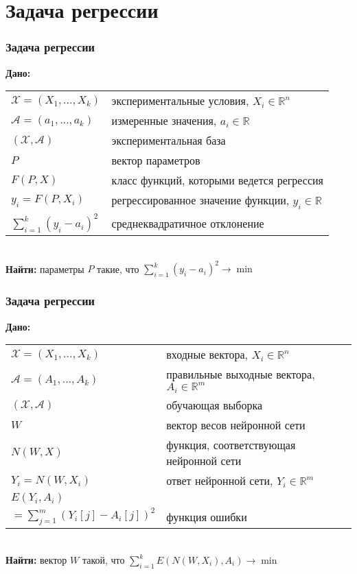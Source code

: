 \documentclass[24pt,pdf,hyperref={unicode}]{beamer}
\begin{document}
\section{Задача регрессии}

\begin{frame}\frametitle{Задача регрессии}
{\bf Дано:}
\begin{tabular}{p{4cm} p{6cm}}
 $\mathcal{X}=(X_1,\ldots,X_k)$ & экспериментальные условия, $X_i\in\mathbb{R}^n$\\[0.1cm]
 $\mathcal{A}=(a_1,\ldots,a_k)$ & измеренные значения, $a_i\in\mathbb{R}$\\[0.1cm]
 $(\mathcal{X},\mathcal{A})$ & экспериментальная база \\[0.1cm]
 $P$ & вектор параметров \\[0.1cm]
 $F(P,X)$ & класс функций, которыми ведется регрессия \\[0.1cm]
 $y_i=F(P,X_i)$ & регрессированное значение функции, $y_i\in\mathbb{R}$ \\[0.1cm]
$\sum_{i=1}^{k} (y_i-a_i)^2 $ & среднеквадратичное отклонение\\
 \end{tabular}\\[1cm]
 {\bf Найти:}
 параметры $P$ такие, что $\sum_{i=1}^{k} (y_i-a_i)^2 \rightarrow \min$
\end{frame}

\begin{frame}\frametitle{Задача регрессии}
{\bf Дано:}
\begin{tabular}{p{4cm} p{6cm}}
 $\mathcal{X}=(X_1,\ldots,X_k)$ & входные вектора, $X_i\in\mathbb{R}^n$\\[0.1cm]
 $\mathcal{A}=(A_1,\ldots,A_k)$ & правильные выходные вектора, $A_i\in\mathbb{R}^m$\\[0.1cm]
 $(\mathcal{X},\mathcal{A})$ & обучающая выборка  \\[0.1cm]
 $W$ & вектор весов нейронной сети \\[0.1cm]
 $N(W,X)$ & функция, соответствующая нейронной сети \\[0.1cm]
 $Y_i=N(W,X_i)$ & ответ нейронной сети, $Y_i\in\mathbb{R}^m$ \\[0.1cm]
$E(Y_i,A_i)$ & \\
$=\sum_{j=1}^{m} (Y_i[j]-A_i[j])^2 $ & функция ошибки \\
 \end{tabular}\\[1cm]
{\bf Найти:}
вектор $W$ такой, что $\sum_{i=1}^k E(N(W,X_i),A_i)\rightarrow \min$
\end{frame}
\end{document}
